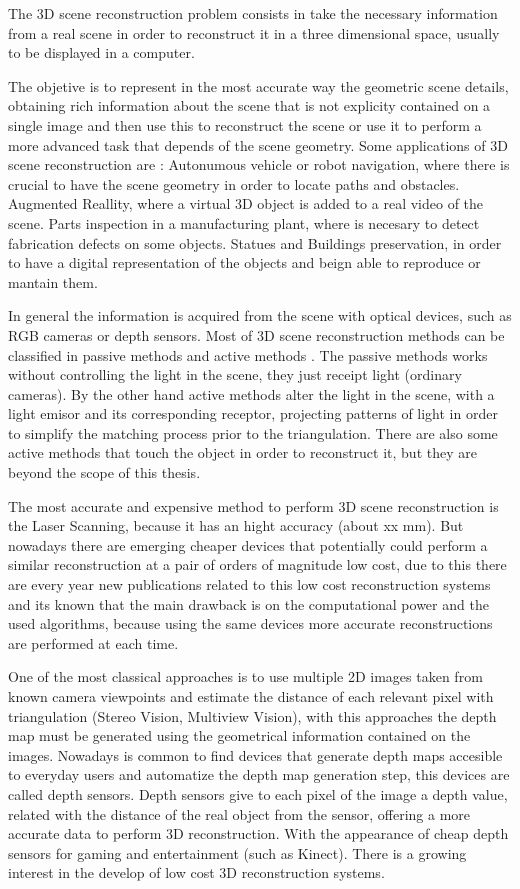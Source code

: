 
The 3D scene reconstruction problem consists in take the
necessary information from a real scene in order to reconstruct
it in a three dimensional space, usually to be displayed 
in a computer. 

The objetive is to represent in the most accurate way the geometric scene details, obtaining rich 
information about the scene that is not explicity contained on a single image and then use this 
to reconstruct the scene or use it to perform a more advanced task that depends of the scene geometry. 
Some applications of 3D scene reconstruction are : Autonumous vehicle or robot navigation, where there is crucial to have 
the scene geometry in order to locate paths and obstacles. Augmented Reallity, where a virtual 3D object
 is added to a real video of the scene. Parts inspection in a manufacturing plant, where is necesary to detect
 fabrication defects on some objects. Statues and Buildings preservation, in order to have a digital representation 
of the objects and beign able to reproduce or mantain them.

 
In general the information is acquired
 from the scene with optical devices, such as RGB cameras or depth sensors.
Most of 3D scene reconstruction methods can be classified in passive methods and active methods \cite{lanman}.
The passive methods works without controlling the light in the scene, they just receipt light (ordinary cameras). 
By the other hand active methods alter the light in the scene, with a light emisor and its corresponding 
receptor, projecting patterns of light in order to simplify the matching process prior to the triangulation. 
There are also some active methods that touch the object in order to reconstruct it, but they are beyond 
the scope of this thesis. 

The most accurate and expensive method to perform 3D scene reconstruction is the Laser Scanning, because it has 
an hight accuracy (about xx mm). But nowadays there are emerging cheaper devices that potentially could perform 
a similar reconstruction at a pair of orders of magnitude low cost, due to this there are every year new publications 
related to this low cost reconstruction systems and its known that the main drawback is on the computational power and 
the used algorithms, because using the same devices more accurate reconstructions are performed at each time. 

One of the most classical approaches is to use multiple 2D
 images taken from known camera viewpoints and estimate the distance of each
 relevant pixel with triangulation (Stereo Vision, Multiview Vision), with this 
approaches the depth map must be generated using the geometrical information contained
 on the images. Nowadays is common to find devices that generate depth maps accesible
 to everyday users and automatize the depth map generation step, this devices are called depth sensors. 
Depth sensors give to each pixel of the image a depth value, related
with the distance of the real object from the sensor, offering a more
accurate data to perform 3D reconstruction. With the appearance
of cheap depth sensors for gaming and entertainment (such as
Kinect). There is a growing interest in the develop of low cost
3D reconstruction systems. 


